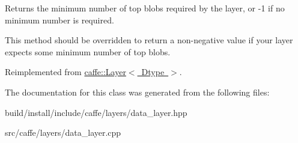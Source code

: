Returns the minimum number of top blobs required by the layer, or -\/1 if no minimum number is required. 

This method should be overridden to return a non-\/negative value if your layer expects some minimum number of top blobs. 

Reimplemented from \mbox{\hyperlink{classcaffe_1_1_layer_ab9e4c8d642e413948b131d851a8462a4}{caffe\+::\+Layer$<$ Dtype $>$}}.



The documentation for this class was generated from the following files\+:\begin{DoxyCompactItemize}
\item 
build/install/include/caffe/layers/data\+\_\+layer.\+hpp\item 
src/caffe/layers/data\+\_\+layer.\+cpp\end{DoxyCompactItemize}
